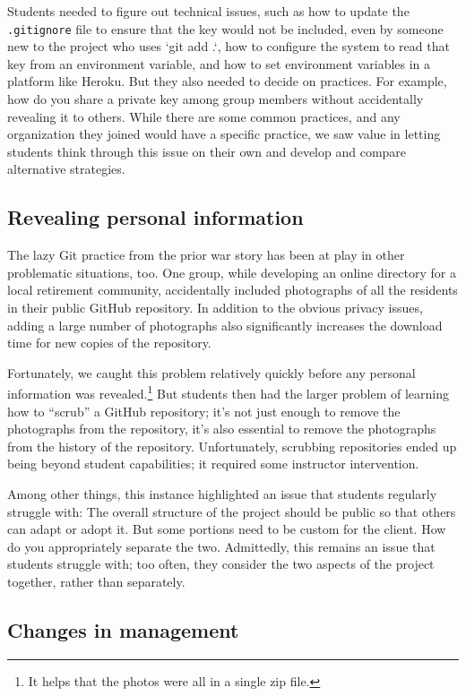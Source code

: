 Students needed to figure out technical issues, such as how
to update the \texttt{.gitignore} file to ensure that the key would
not be included, even by someone new to the project who uses `git
add .`, how to configure the system to read that key from an
environment variable, and how to set environment variables in a
platform like Heroku.  But they also needed to decide on practices.
For example, how do you share a private key among group members without
accidentally revealing it to others.  While there are some common practices,
and any organization they joined would have a specific practice, we saw
value in letting students think through this issue on their own and
develop and compare alternative strategies.

\subsection{Revealing personal information}

The lazy Git practice from the prior war story has been at play
in other problematic situations, too.  One group, while developing
an online directory for a local retirement community, accidentally
included photographs of all the residents in their public GitHub
repository.  In addition to the obvious privacy issues, adding a
large number of photographs also significantly increases the download
time for new copies of the repository.

Fortunately, we caught this problem relatively quickly before any
personal information was revealed.\footnote{It helps that the photos
were all in a single zip file.}  But students then had the larger
problem of learning how to ``scrub'' a GitHub repository; it's not
just enough to remove the photographs from the repository, it's
also essential to remove the photographs from the history of the
repository.  Unfortunately, scrubbing repositories ended up being
beyond student capabilities; it required some instructor intervention.

Among other things, this instance highlighted an issue that students
regularly struggle with: The overall structure of the project should
be public so that others can adapt or adopt it.  But some portions
need to be custom for the client.  How do you appropriately separate the
two.  Admittedly, this remains an issue that students struggle with;
too often, they consider the two aspects of the project together,
rather than separately.

\subsection{Changes in management}

